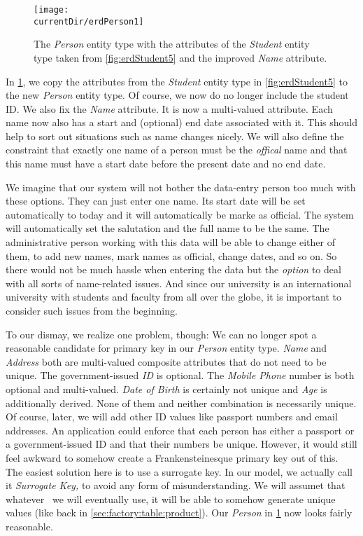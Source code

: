 \begin{figure}%
\centering%
\texttt{[image: \\currentDir/erdPerson1]}%
\caption{The \emph{Person} entity type with the attributes of the \emph{Student} entity type taken from \cref{fig:erdStudent5} and the improved \emph{Name} attribute.}%
\label{fig:erdPerson1}%
\end{figure}%
%
In \cref{fig:erdPerson1}, we copy the attributes from the \emph{Student} entity type in \cref{fig:erdStudent5} to the new \emph{Person} entity type.
Of course, we now do no longer include the student ID.
We also fix the \emph{Name} attribute.
It is now a multi-valued attribute.
Each name now also has a start and (optional) end date associated with it.
This should help to sort out situations such as name changes nicely.
We will also define the constraint that exactly one name of a person must be the \emph{offical} name and that this name must have a start date before the present date and no end date.

We imagine that our system will not bother the data-entry person too much with these options.
They can just enter one name.
Its start date will be set automatically to today and it will automatically be marke as official.
The system will automatically set the salutation and the full name to be the same.
The administrative person working with this data will be able to change either of them, to add new names, mark names as official, change dates, and so on.
So there would not be much hassle when entering the data but the \emph{option} to deal with all sorts of name-related issues.
And since our university is an international university with students and faculty from all over the globe, it is important to consider such issues from the beginning.

To our dismay, we realize one problem, though:
We can no longer spot a reasonable candidate for primary key in our \emph{Person} entity type.
\emph{Name} and \emph{Address} both are multi-valued composite attributes that do not need to be unique.
The government-issued \emph{ID} is optional.
The \emph{Mobile Phone} number is both optional and multi-valued.
\emph{Date of Birth} is certainly not unique and \emph{Age} is additionally derived.
None of them and neither combination is necessarily unique.
Of course, later, we will add other ID values like passport numbers and email addresses.
An application could enforce that each person has either a passport or a government-issued ID and that their numbers be unique.
However, it would still feel awkward to somehow create a Frankensteinesque primary key out of this.
The easiest solution here is to use a surrogate key.
In our model, we actually call it \emph{Surrogate Key,} to avoid any form of misunderstanding.
We will assumet that whatever \dbms\ we will eventually use, it will be able to somehow generate unique values (like back in \cref{sec:factory:table:product}).
Our \emph{Person} in \cref{fig:erdPerson1} now looks fairly reasonable.

